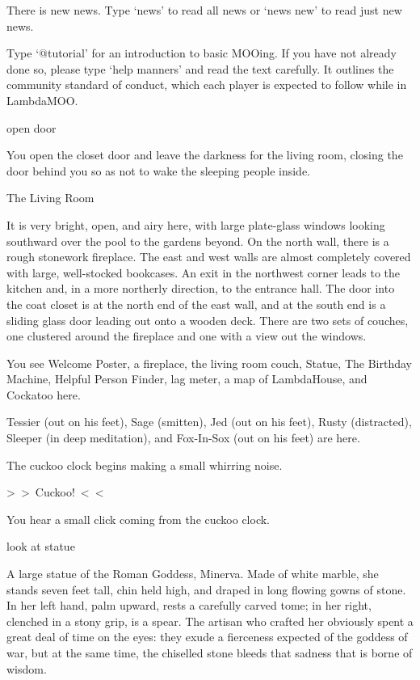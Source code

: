 \documentclass[10pt,twoside,openany]{memoir}
\begin{document}
{There is new news.  Type `news' to read all news or `news new' to read just new news.

Type `@tutorial' for an introduction to basic MOOing.  If you have not already done so, please type `help manners' and read the text carefully.  It outlines the community standard of conduct, which each player is expected to follow while in LambdaMOO.

open door

You open the closet door and leave the darkness for the living room, closing the door behind you so as not to wake the sleeping people inside.

The Living Room

It is very bright, open, and airy here, with large plate-glass windows looking southward over the pool to the gardens beyond.  On the north wall, there is a rough stonework fireplace.  The east and west walls are almost completely covered with large, well-stocked bookcases.  An exit in the northwest corner leads to the kitchen and, in a more northerly direction, to the entrance hall.  The door into the coat closet is at the north end of the east wall, and at the south end is a sliding glass door leading out onto a wooden deck.  There are two sets of couches, one clustered around the fireplace and one with a view out the windows.

You see Welcome Poster, a fireplace, the living room couch, Statue, The Birthday Machine, Helpful Person Finder, lag meter, a map of LambdaHouse, and Cockatoo here.

Tessier (out on his feet), Sage (smitten), Jed (out on his feet), Rusty (distracted), Sleeper (in deep meditation), and Fox-In-Sox (out on his feet) are here.

The cuckoo clock begins making a small whirring noise.

 >~>~Cuckoo!~<~<

You hear a small click coming from the cuckoo clock.

look at statue

A large statue of the Roman Goddess, Minerva. Made of white marble, she stands seven feet tall, chin held high, and draped in long flowing gowns of stone. In her left hand, palm upward, rests a carefully carved tome; in her right, clenched in a stony grip, is a spear.  The artisan who crafted her obviously spent a great deal of time on the eyes: they exude a fierceness expected of the goddess of war, but at the same time, the chiselled stone bleeds that sadness that is borne of wisdom.

}
\end{document}
